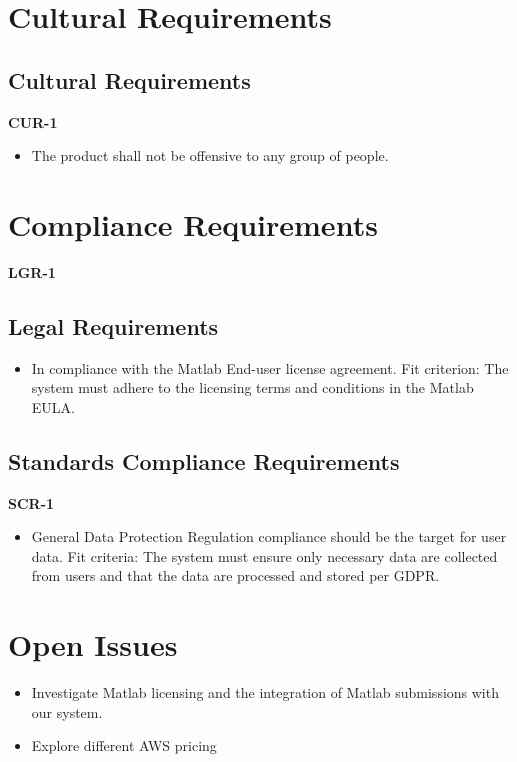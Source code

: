 \documentclass[12pt]{article}
\begin{document}
\section{Cultural Requirements}
\subsection{Cultural Requirements}
\textbf{CUR-1}
\begin{itemize}
    \item The product shall not be offensive to any group of people.
\end{itemize}

\section{Compliance Requirements}
\textbf{LGR-1}
\subsection{Legal Requirements}
\begin{itemize}
    \item In compliance with the Matlab End-user license agreement. \hfill \break
    Fit criterion: The system must adhere to the licensing terms and conditions in the Matlab EULA.

\end{itemize}
\subsection{Standards Compliance Requirements}
\textbf{SCR-1}
\begin{itemize}
    \item General Data Protection Regulation compliance should be the target for user data. \hfill \break
    Fit criteria: The system must ensure only necessary data are collected from users and that the data are processed and stored per GDPR. 

\end{itemize}

\section{Open Issues}
\begin{itemize}
    \item Investigate Matlab licensing and the integration of Matlab submissions with our system.
    \item Explore different AWS pricing
\end{itemize}
\end{document}
